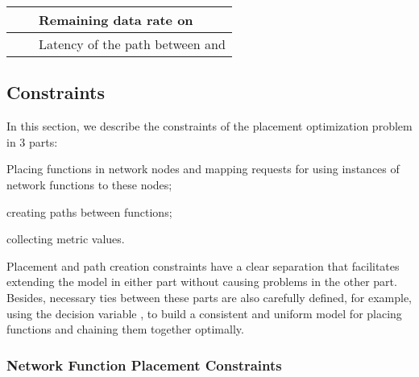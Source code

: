 \documentclass[10pt,a4paper,conference]{IEEEtran}
\begin{document}
\begin{table}[!t]
\begin{tabular}{lll}
                                                                                                   &  	& Remaining data rate on                                                                                                                     \\ \hline
                                                                                      &    	& Latency of the path between  and                                                                                           \\ \hline
\end{tabular}
\end{table}

\subsection{Constraints}
\label{subsec:constraints}

In this section, we describe the constraints of the placement optimization problem 
in 3 parts:
\begin{inparaenum}
 \item Placing functions in network nodes and mapping requests for using instances
 of network functions to these nodes;
 \item creating paths between functions;
 \item collecting metric values.
\end{inparaenum}
Placement and path creation constraints have a clear separation that facilitates 
extending the model in either part without causing problems in the other part.
Besides, necessary ties between these parts are also carefully defined, for example, using
the decision variable , to build a
consistent and uniform model for placing functions and chaining them together optimally.

\subsubsection{Network Function Placement Constraints}
\end{document}
